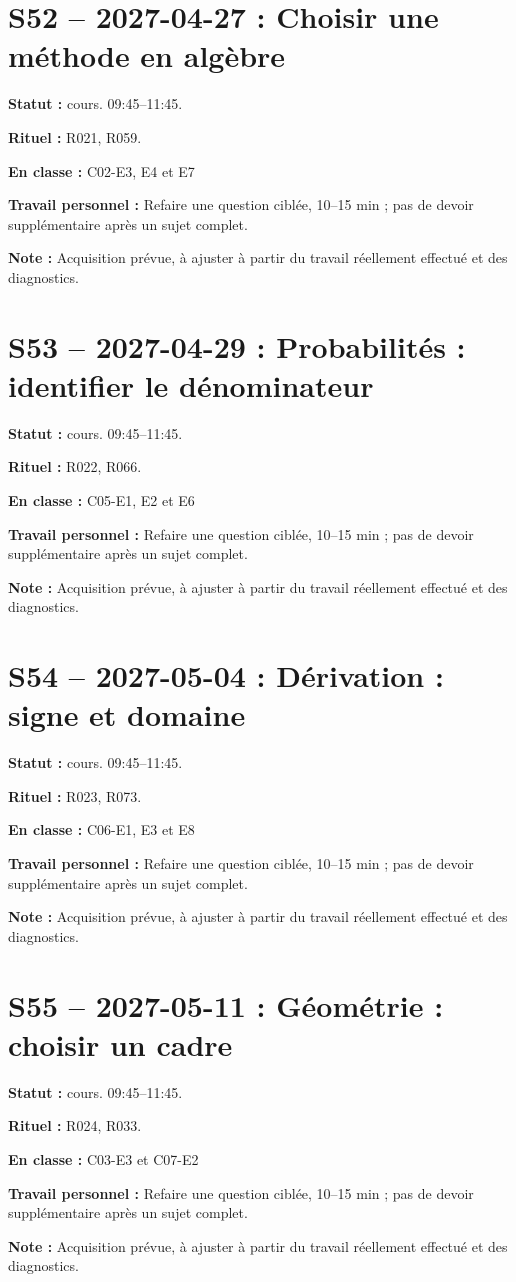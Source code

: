 \section*{S52 -- 2027-04-27 : Choisir une méthode en algèbre}
\textbf{Statut :} cours. 09:45–11:45.\par\textbf{Rituel :} R021, R059.\par\textbf{En classe :} C02-E3, E4 et E7\par\textbf{Travail personnel :} Refaire une question ciblée, 10–15 min ; pas de devoir supplémentaire après un sujet complet.\par\textbf{Note :} Acquisition prévue, à ajuster à partir du travail réellement effectué et des diagnostics.
\section*{S53 -- 2027-04-29 : Probabilités : identifier le dénominateur}
\textbf{Statut :} cours. 09:45–11:45.\par\textbf{Rituel :} R022, R066.\par\textbf{En classe :} C05-E1, E2 et E6\par\textbf{Travail personnel :} Refaire une question ciblée, 10–15 min ; pas de devoir supplémentaire après un sujet complet.\par\textbf{Note :} Acquisition prévue, à ajuster à partir du travail réellement effectué et des diagnostics.
\section*{S54 -- 2027-05-04 : Dérivation : signe et domaine}
\textbf{Statut :} cours. 09:45–11:45.\par\textbf{Rituel :} R023, R073.\par\textbf{En classe :} C06-E1, E3 et E8\par\textbf{Travail personnel :} Refaire une question ciblée, 10–15 min ; pas de devoir supplémentaire après un sujet complet.\par\textbf{Note :} Acquisition prévue, à ajuster à partir du travail réellement effectué et des diagnostics.
\section*{S55 -- 2027-05-11 : Géométrie : choisir un cadre}
\textbf{Statut :} cours. 09:45–11:45.\par\textbf{Rituel :} R024, R033.\par\textbf{En classe :} C03-E3 et C07-E2\par\textbf{Travail personnel :} Refaire une question ciblée, 10–15 min ; pas de devoir supplémentaire après un sujet complet.\par\textbf{Note :} Acquisition prévue, à ajuster à partir du travail réellement effectué et des diagnostics.
